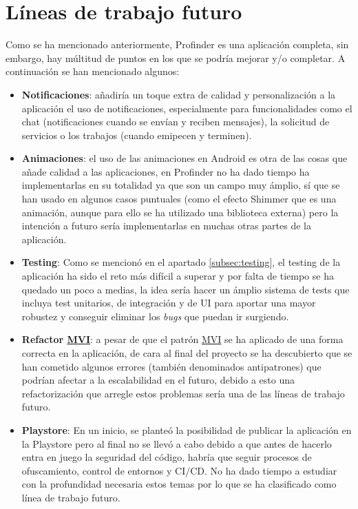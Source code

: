 \section{Líneas de trabajo futuro}
Como se ha mencionado anteriormente, Profinder es una aplicación completa, sin embargo, hay múltitud de puntos en los que se podría mejorar y/o completar. A continuación se han mencionado algunos:
\begin{itemize}
    \item \textbf{Notificaciones}: añadiría un toque extra de calidad y personalización a la aplicación el uso de notificaciones, especialmente para funcionalidades como el chat (notificaciones cuando se envían y reciben mensajes), la solicitud de servicios o los trabajos (cuando emipecen y terminen).
    \item \textbf{Animaciones}: el uso de las animaciones en Android es otra de las cosas que añade calidad a las aplicaciones, en Profinder no ha dado tiempo ha implementarlas en su totalidad ya que son un campo muy ámplio, sí que se han usado en algunos casos puntuales (como el efecto Shimmer que es una animación, aunque para ello se ha utilizado una biblioteca externa\hyperlink{cap:biblio}{}) pero la intención a futuro sería implementarlas en muchas otras partes de la aplicación.
    \item \textbf{Testing}: Como se mencionó en el apartado \ref{subsec:testing}, el testing de la aplicación ha sido el reto más difícil a superar y por falta de tiempo se ha quedado un poco a medias, la idea sería hacer un ámplio sistema de tests que incluya test unitarios, de integración y de UI para aportar una mayor robustez y conseguir eliminar los \textit{bugs} que puedan ir surgiendo.
    \item \textbf{Refactor  \hyperlink{subsec:mvi}{MVI}}: a pesar de que el patrón \hyperlink{subsec:mvi}{MVI} se ha aplicado de una forma correcta en la aplicación, de cara al final del proyecto se ha descubierto que se han cometido algunos errores (también denominados antipatrones) que podrían afectar a la escalabilidad en el futuro, debido a esto una refactorización que arregle estos problemas sería una de las líneas de trabajo futuro.
    \item \textbf{Playstore}: En un inicio, se planteó la posibilidad de publicar la aplicación en la Playstore pero al final no se llevó a cabo debido a que antes de hacerlo entra en juego la seguridad del código, habría que seguir procesos de ofuscamiento, control de entornos y CI/CD. No ha dado tiempo a estudiar con la profundidad necesaria estos temas por lo que se ha clasificado como línea de trabajo futuro.

\end{itemize}
